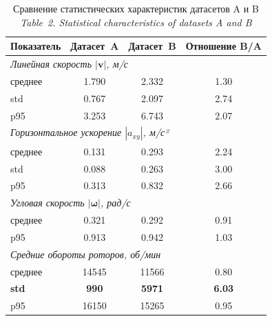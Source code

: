 \begin{table}[htbp]
	\centering
	\caption{Сравнение статистических характеристик датасетов A и B\\
		\textit{Table~2. Statistical characteristics of datasets A and B}}
	\label{tab:dataset}
	\begin{tabular}{l *{3}{c}}
		\toprule
		{Показатель} &
		\multicolumn{1}{c}{Датасет~A} &
		\multicolumn{1}{c}{Датасет~B} &
		\multicolumn{1}{c}{Отношение B/A} \\
		\midrule
		\multicolumn{4}{l}{\textit{Линейная скорость $|\mathbf{v}|$, м/с}} \\
		\quad среднее & \num{1.790} & \num{2.332} & \num{1.30} \\
		\quad std & \num{0.767} & \num{2.097} & \num{2.74} \\
		\quad p95 & \num{3.253} & \num{6.743} & \num{2.07} \\
		\midrule
		\multicolumn{4}{l}{\textit{Горизонтальное ускорение $|a_{xy}|$, м/с²}} \\
		\quad среднее & \num{0.131} & \num{0.293} & \num{2.24} \\
		\quad std & \num{0.088} & \num{0.263} & \num{3.00} \\
		\quad p95 & \num{0.313} & \num{0.832} & \num{2.66} \\
		\midrule
		\multicolumn{4}{l}{\textit{Угловая скорость $|\boldsymbol{\omega}|$, рад/с}} \\
		\quad среднее & \num{0.321} & \num{0.292} & \num{0.91} \\
		\quad p95 & \num{0.913} & \num{0.942} & \num{1.03} \\
		\midrule
		\multicolumn{4}{l}{\textit{Средние обороты роторов, об/мин}} \\
		\quad среднее & \num{14545} & \num{11566} & \num{0.80} \\
		\quad \textbf{std} & \textbf{\num{990}} & \textbf{\num{5971}} & \textbf{\num{6.03}} \\
		\quad p95 & \num{16150} & \num{15265} & \num{0.95} \\
		\bottomrule
	\end{tabular}
\end{table}

